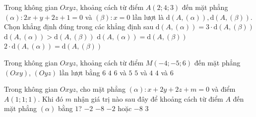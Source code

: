 \begin{ex} %
	Trong không gian $Oxyz$, khoảng cách từ điểm $A(2;4;3)$ đến mặt phẳng $(\alpha)\colon 2x+y+2z+1=0$ và $(\beta)\colon x=0$ lần lượt là $\mathrm{d}(A,(\alpha)), \mathrm{d}(A,(\beta))$. Chọn khẳng định đúng trong các khẳng định sau
	\choice
	{$\mathrm{d}(A,(\alpha))=3\cdot \mathrm{d}(A,(\beta))$}
	{$\mathrm{d}(A,(\alpha))>\mathrm{d}(A,(\beta))$}
	{$\mathrm{d}(A,(\alpha))=\mathrm{d}(A,(\beta))$}
	{\True $2\cdot\mathrm{d}(A,(\alpha))=\mathrm{d}(A,(\beta))$}
\end{ex}
\begin{ex}%
	Trong không gian $Oxyz$, khoảng cách từ điểm $M(-4;-5;6)$ đến mặt phẳng $(Oxy)$, $(Oyz)$ lần lượt bằng
	\choice
	{\True $6$  $4$}   
	{$6$ và $5$}
	{$5$ và $4$}
	{$4$ và $6$}
\end{ex}
\begin{ex}%
	Trong không gian $Oxyz$, cho mặt phẳng $(\alpha)\colon x+2y+2z+m=0$ và điểm $A(1;1;1)$. Khi đó $m$ nhận giá trị nào sau đây để khoảng cách từ điểm $A$ đến mặt phẳng $(\alpha)$ bằng $1$?
	\choice
	{$-2$}
	{$-8$}
	{\True $-2$ hoặc $-8$}
	{$3$}
\end{ex}
